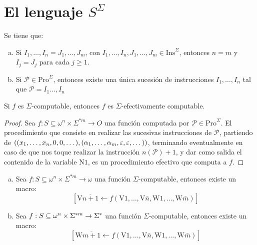 \section{El lenguaje ${S}^{\Sigma}$}

  \begin{lemma}
    \PN Se tiene que:

    \begin{enumerate}[a)]
      \item Si $I_{1}, \dotsc, I_{n} = J_{1}, \dotsc, J_{m}$, con $I_{1}, \dotsc, I_{n}, J_{1}, \dotsc, J_{m} \in
        \mathrm{Ins}^{\Sigma}$, entonces $n=m$ y $I_{j}=J_{j}$ para cada $j \geq 1$.
      \item Si $\mathcal{P} \in \mathrm{Pro}^{\Sigma}$, entonces existe una única sucesión de instrucciones $I_{1},
        \dotsc, I_{n}$ tal que $\mathcal{P} = I_{1} \dotsc, I_{n}$
    \end{enumerate}
  \end{lemma}

  \begin{theorem}
    \PN Si $f$ es $\Sigma$-computable, entonces $f$ es $\Sigma$-efectivamente computable.
  \end{theorem}
  \begin{proof}
    \PN Sea $f: S \subseteq \omega^{n} \times \Sigma^{\ast m} \rightarrow O$ una función computada por $\mathcal{P} \in
    \mathrm{Pro}^{\Sigma}$. El procedimiento que consiste en realizar las sucesivas instrucciones de $\mathcal{P}$,
    partiendo de $((x_{1},\dotsc,x_{n},0,0,\dotsc), \linebreak (\alpha_{1},\dotsc,\alpha_{m},\varepsilon,\varepsilon,
    \dotsc))$, terminando eventualmente en caso de que nos toque realizar la instrucción $n(\mathcal{P})+1$, y dar como
    salida el contenido de la variable $\mathrm{N}1$, es un procedimiento efectivo que computa a $f$.
  \end{proof}

  \begin{proposition}
    \begin{enumerate}[a)]
      \item Sea $f: S \subseteq \omega^{n} \times \Sigma^{\ast m} \rightarrow \omega$ una función $\Sigma$-computable,
        entonces existe un macro:
        \[
          \left[\mathrm{V}\overline{n+1}\leftarrow f(\mathrm{V}1,\dotsc,\mathrm{V}\bar{n},\mathrm{W}1,\dotsc,\mathrm{W}
          \bar{m})\right]
        \]

      \item Sea $f: S \subseteq \omega^{n} \times \Sigma^{\ast m} \rightarrow \Sigma^{\ast}$ una función $\Sigma$-computable,
        entonces existe un macro:
        \[
          \left[\mathrm{W}\overline{m+1}\leftarrow f(\mathrm{V}1,\dotsc,\mathrm{V}\bar{n},\mathrm{W}1,\dotsc,\mathrm{W}
          \bar{m})\right]
        \]
    \end{enumerate}
  \end{proposition}

